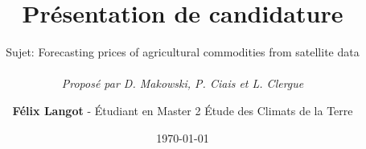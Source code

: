 \documentclass[9pt]{beamer}
\begin{document}
\title{Présentation de candidature}
\subtitle{Sujet: Forecasting prices of agricultural commodities from satellite data \\ ~\\
\textit{Proposé par D. Makowski, P. Ciais et L. Clergue}}
\date{\today}
\author{\textbf{Félix Langot} - Étudiant en Master 2 Étude des Climats de la Terre}

\begin{frame}
  \maketitle
\end{frame}


\end{document}
